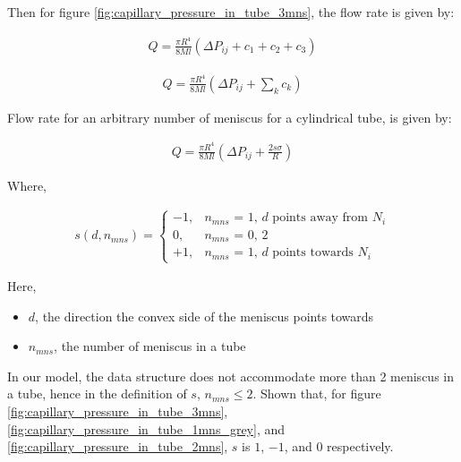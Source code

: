 \documentclass{crm-article}
\begin{document}
		Then for figure \ref{fig:capillary_pressure_in_tube_3mns}, the flow rate is given by:
		
		\begin{gather}
			Q = \frac{\pi R^4}{8Ml} \left( \Delta P_{ij} + c_1 + c_2 + c_3 \right)
		\end{gather}
		
		\begin{gather}
			Q = \frac{\pi R^4}{8Ml} \left( \Delta P_{ij} + \sum_{k} c_{k} \right)
		\end{gather}
		
		Flow rate for an arbitrary number of meniscus for a cylindrical tube, is given by:
		
		\begin{gather} \label{eq:main-flow-rate-with-s}
			\boxed{Q = \frac{\pi R^4}{8Ml} \left( \Delta P_{ij} + \frac{2s \sigma}{R} \right)}
		\end{gather}
		
		Where,
		
		\begin{gather} \label{eq:sign-func-def}
			s(d, n_{mns}) = 
			\begin{cases}
				-1,&\text{$n_{mns}$ = 1, $d$ points away from $N_{i}$}\\
				0,&\text{$n_{mns}$ = 0, 2}\\
				+1,&\text{$n_{mns}$ = 1, $d$ points towards $N_{i}$}
			\end{cases}
		\end{gather}
		
		Here,
		\begin{itemize}
			\item $d$, the direction the convex side of the meniscus points towards
			\item $n_{mns}$, the number of meniscus in a tube
		\end{itemize}
		
		In our model, the data structure does not accommodate more than 2 meniscus in a tube, hence in the definition of $s$, $n_{mns} \le 2$. Shown that, for figure \ref{fig:capillary_pressure_in_tube_3mns}, \ref{fig:capillary_pressure_in_tube_1mns_grey}, and \ref{fig:capillary_pressure_in_tube_2mns}, $s$ is $1$, $-1$, and $0$ respectively.
		
\end{document}
